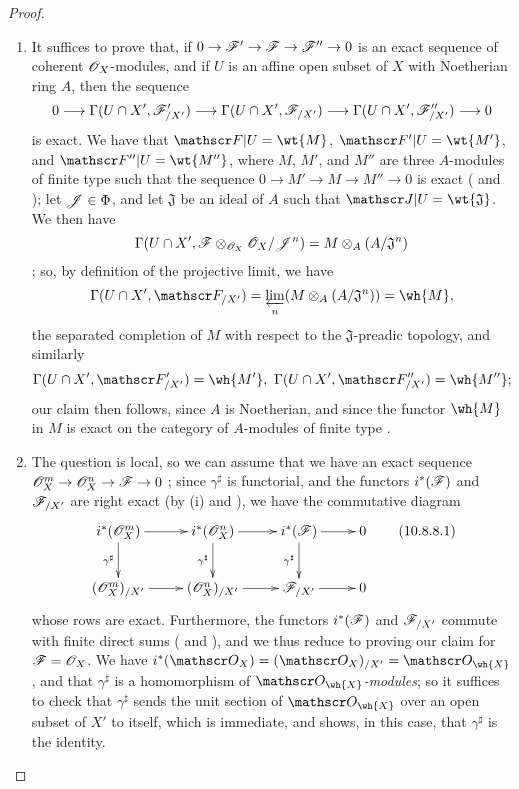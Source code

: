 \begin{proof}
\label{proof-1.10.8.8}
\medskip\noindent
\begin{enumerate}[label=(\roman*)]
  \item It suffices to prove that, if $0\to\sh{F}'\to\sh{F}\to\sh{F}''\to 0$ is an exact sequence of coherent $\mathscr{O}_X$-modules, and if $U$ is an affine open subset of $X$ with Noetherian ring $A$, then the sequence
\[
  0\to\Gamma(U\cap X',\sh{F}_{/X'}')\to\Gamma(U\cap X',\sh{F}_{/X'})\to\Gamma(U\cap X',\sh{F}_{/X'}'')\to 0
\]
is exact.
We have that $\sh{F}|U=\wt{M}$, $\sh{F}'|U=\wt{M'}$, and $\sh{F}''|U=\wt{M''}$, where $M$, $M'$, and $M''$ are three $A$-modules of finite type such that the sequence $0\to M'\to M\to M''\to 0$ is exact ( and ); let $\mathscr{J}\in\Phi$, and let $\mathfrak{J}$ be an ideal of $A$ such that $\sh{J}|U=\wt{\mathfrak{J}}$.
We then have
\[
  \Gamma(U\cap X',\mathscr{F}\otimes_{\mathscr{O}_X}\mathscr{O}_X/\mathscr{J}^n)=M\otimes_A(A/\mathfrak{J}^n)
\]
; so, by definition of the projective limit, we have
\[
  \Gamma(U\cap X',\sh{F}_{/X'})=\varprojlim_n(M\otimes_A(A/\mathfrak{J}^n))=\wh{M},
\]
the separated completion of $M$ with respect to the $\mathfrak{J}$-preadic topology, and similarly
\[
  \Gamma(U\cap X',\sh{F}_{/X'}')=\wh{M'},\ \Gamma(U\cap X',\sh{F}_{/X'}'')=\wh{M''};
\]
our claim then follows, since $A$ is Noetherian, and since the functor $\wh{M}$ in $M$ is exact on the category of $A$-modules of finite type .
  \item The question is local, so we can assume that we have an exact sequence $\sh{O}_X^m\to\sh{O}_X^n\to\sh{F}\to 0$ ; since $\gamma^\sharp$ is functorial, and the functors $i^*(\mathscr{F})$ and $\mathscr{F}_{/X'}$ are right exact (by (i) and ), we have the commutative diagram
\begin{equation*}
\label{1.10.8.8.1}
  \xymatrix{
    i^*(\sh{O}_X^m)\ar[r]\ar[d]_{\gamma^\sharp} &
    i^*(\sh{O}_X^n)\ar[r]\ar[d]_{\gamma^\sharp} &
    i^*(\sh{F})\ar[r]\ar[d]_{\gamma^\sharp} &
    0\\
    (\sh{O}_X^m)_{/X'}\ar[r] &
    (\sh{O}_X^n)_{/X'}\ar[r] &
    \sh{F}_{/X'}\ar[r] &
    0
  }
  \tag{10.8.8.1}
\end{equation*}
whose rows are exact.
Furthermore, the functors $i^*(\mathscr{F})$ and $\mathscr{F}_{/X'}$ commute with finite direct sums ( and ), and we thus reduce to proving our claim for $\mathscr{F}=\mathscr{O}_X$.
We have $i^*(\sh{O}_X)=(\sh{O}_X)_{/X'}=\sh{O}_\wh{X}$ , and that $\gamma^\sharp$ is a homomorphism of \emph{$\sh{O}_\wh{X}$-modules}; so it suffices to check that $\gamma^\sharp$ sends the unit section of $\sh{O}_\wh{X}$ over an open subset of $X'$ to itself, which is immediate, and shows, in this case, that $\gamma^\sharp$ is the identity.
\end{enumerate}
\end{proof}

